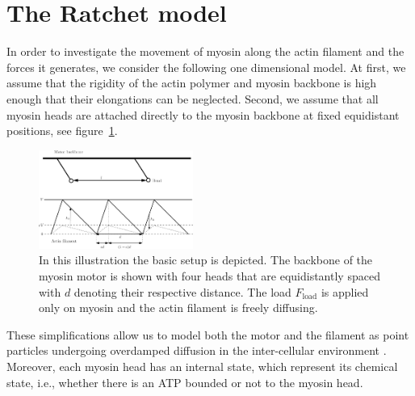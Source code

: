 \documentclass[aps,pre,twocolumn,showpacs,showkeys,superscriptaddress,floatfix]{revtex4-1}
\begin{document}
\section{The Ratchet model}
\label{sec:ratchet}
In order to investigate the movement of myosin along the actin filament and the forces it generates, we consider the following one dimensional model.
At first, we assume that the rigidity of the actin polymer and myosin backbone is high enough that their elongations can be neglected.
Second, we assume that all myosin heads are attached directly to the myosin backbone at fixed equidistant positions, see figure~\ref{fig:ratchet_setup}.
\begin{figure}[t]
\centering
\includegraphics[width=0.45\textwidth,height=!]{ratchet_illustration}
\caption{
\label{fig:ratchet_setup}
In this illustration the basic setup is depicted.  
The backbone of the myosin motor is shown with four heads that are equidistantly spaced with $d$ denoting their respective distance. 
The load $F_\text{load}$ is applied only on myosin and the actin filament is freely diffusing. 
} 
\end{figure}
These simplifications allow us to model both the motor and the filament as point particles undergoing overdamped diffusion in the inter-cellular environment \cite{vanKampen1981stochastic}.
Moreover, each myosin head has an internal state, which represent its chemical state, 
i.e., whether there is an ATP bounded or not to the myosin head. 
\end{document}
